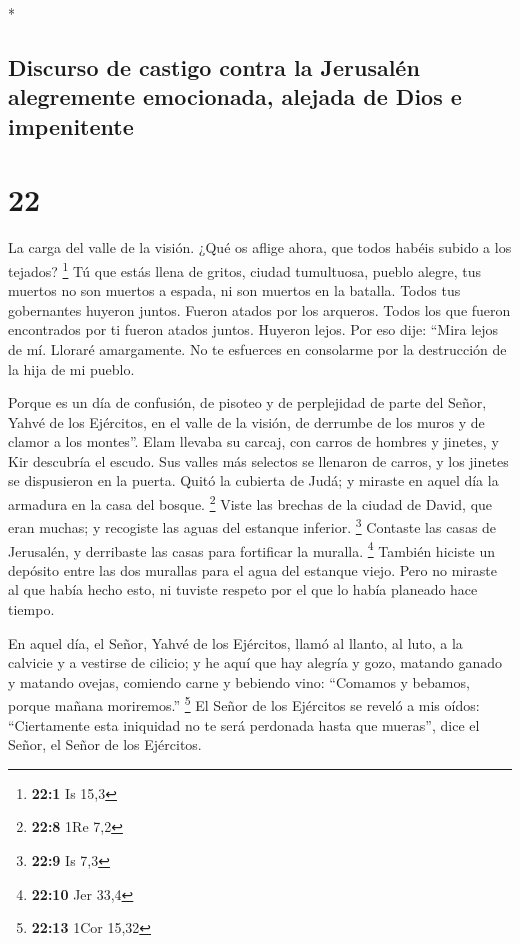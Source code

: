\begin{paracol}{2}
\switchcolumn[0]*

\hypertarget{discurso-de-castigo-contra-la-jerusaluxe9n-alegremente-emocionada-alejada-de-dios-e-impenitente}{%
\subsection{Discurso de castigo contra la Jerusalén alegremente
emocionada, alejada de Dios e
impenitente}\label{discurso-de-castigo-contra-la-jerusaluxe9n-alegremente-emocionada-alejada-de-dios-e-impenitente}}

\hypertarget{section-42}{%
\section{22}\label{section-42}}

 La carga del valle de la visión. ¿Qué os aflige ahora,
que todos habéis subido a los tejados? \footnote{\textbf{22:1} Is 15,3}
 Tú que estás llena de gritos, ciudad tumultuosa, pueblo
alegre, tus muertos no son muertos a espada, ni son muertos en la
batalla.  Todos tus gobernantes huyeron juntos. Fueron
atados por los arqueros. Todos los que fueron encontrados por ti fueron
atados juntos. Huyeron lejos.  Por eso dije: ``Mira lejos
de mí. Lloraré amargamente. No te esfuerces en consolarme por la
destrucción de la hija de mi pueblo.

 Porque es un día de confusión, de pisoteo y de
perplejidad de parte del Señor, Yahvé de los Ejércitos, en el valle de
la visión, de derrumbe de los muros y de clamor a los montes''.
 Elam llevaba su carcaj, con carros de hombres y jinetes,
y Kir descubría el escudo.  Sus valles más selectos se
llenaron de carros, y los jinetes se dispusieron en la puerta.
 Quitó la cubierta de Judá; y miraste en aquel día la
armadura en la casa del bosque. \footnote{\textbf{22:8} 1Re 7,2}
 Viste las brechas de la ciudad de David, que eran muchas;
y recogiste las aguas del estanque inferior. \footnote{\textbf{22:9} Is
  7,3}  Contaste las casas de Jerusalén, y derribaste las
casas para fortificar la muralla. \footnote{\textbf{22:10} Jer 33,4}
 También hiciste un depósito entre las dos murallas para
el agua del estanque viejo. Pero no miraste al que había hecho esto, ni
tuviste respeto por el que lo había planeado hace tiempo.

 En aquel día, el Señor, Yahvé de los Ejércitos, llamó al
llanto, al luto, a la calvicie y a vestirse de cilicio; 
y he aquí que hay alegría y gozo, matando ganado y matando ovejas,
comiendo carne y bebiendo vino: ``Comamos y bebamos, porque mañana
moriremos.'' \footnote{\textbf{22:13} 1Cor 15,32}  El
Señor de los Ejércitos se reveló a mis oídos: ``Ciertamente esta
iniquidad no te será perdonada hasta que mueras'', dice el Señor, el
Señor de los Ejércitos.


\end{paracol}
